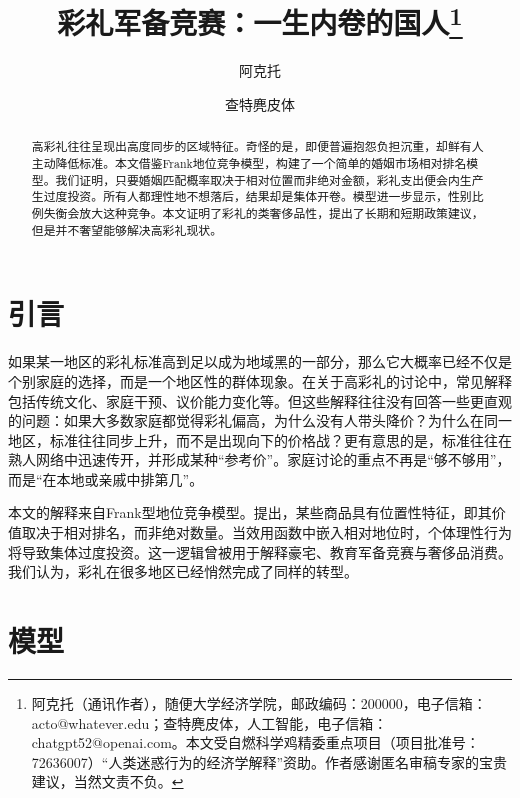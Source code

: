 \documentclass[11pt, a4paper, UTF8]{chinese-erj}
\begin{document}
\setcounter{page}{17} 

\title{彩礼军备竞赛：一生内卷的国人\thanks{阿克托（通讯作者），随便大学经济学院，邮政编码：200000，电子信箱：acto@whatever.edu；查特麂皮体，人工智能，电子信箱：chatgpt52@openai.com。本文受自燃科学鸡精委重点项目（项目批准号：72636007）“人类迷惑行为的经济学解释”资助。作者感谢匿名审稿专家的宝贵建议，当然文责不负。}}
\author{阿克托 \and 查特麂皮体}
\date{} 

\maketitle

\begin{abstract}
高彩礼往往呈现出高度同步的区域特征。奇怪的是，即便普遍抱怨负担沉重，却鲜有人主动降低标准。本文借鉴Frank地位竞争模型，构建了一个简单的婚姻市场相对排名模型。我们证明，只要婚姻匹配概率取决于相对位置而非绝对金额，彩礼支出便会内生产生过度投资。所有人都理性地不想落后，结果却是集体开卷。模型进一步显示，性别比例失衡会放大这种竞争。本文证明了彩礼的类奢侈品性，提出了长期和短期政策建议，但是并不奢望能够解决高彩礼现状。
\end{abstract}

\section{引言}

如果某一地区的彩礼标准高到足以成为地域黑的一部分，那么它大概率已经不仅是个别家庭的选择，而是一个地区性的群体现象。在关于高彩礼的讨论中，常见解释包括传统文化、家庭干预、议价能力变化等。但这些解释往往没有回答一些更直观的问题：如果大多数家庭都觉得彩礼偏高，为什么没有人带头降价？为什么在同一地区，标准往往同步上升，而不是出现向下的价格战？更有意思的是，标准往往在熟人网络中迅速传开，并形成某种“参考价”。家庭讨论的重点不再是“够不够用”，而是“在本地或亲戚中排第几”。

本文的解释来自Frank型地位竞争模型。\citet{frank1985}提出，某些商品具有位置性特征，即其价值取决于相对排名，而非绝对数量。当效用函数中嵌入相对地位时，个体理性行为将导致集体过度投资。这一逻辑曾被用于解释豪宅、教育军备竞赛与奢侈品消费。我们认为，彩礼在很多地区已经悄然完成了同样的转型。

\section{模型}
\end{document}
